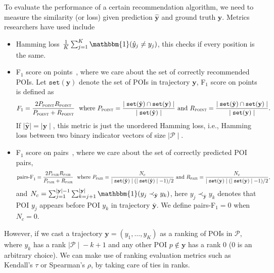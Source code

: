 To evaluate the performance of a certain recommendation algorithm,
we need to measure the similarity (or loss) given prediction $\hat{\mathbf{y}}$ and ground truth $\mathbf{y}$.
Metrics researchers have used include
\begin{itemize}
\item Hamming loss $\frac{1}{K} \sum_{j=1}^K \mathbbm{1}(\hat{y}_j \neq y_j)$, this checks if every position is the same.

\item F$_1$ score on points~\cite{ijcai15}, where we care about the set of correctly recommended POIs. 
      Let $\texttt{set}(\mathbf{y})$ denote the set of POIs in trajectory $\mathbf{y}$, F$_1$ score on points is defined as
\begin{equation*}
F_1 = \frac{2  P_{\textsc{point}}  R_{\textsc{point}}}{P_{\textsc{point}} + R_{\textsc{point}}} ~~\text{where}~
P_{\textsc{point}} = \frac{\mid \texttt{set}(\hat{\mathbf{y}}) \cap \texttt{set}(\mathbf{y}) \mid}{\mid \texttt{set}(\hat{\mathbf{y}}) \mid}~\text{and}~
R_{\textsc{point}} = \frac{\mid \texttt{set}(\hat{\mathbf{y}}) \cap \texttt{set}(\mathbf{y}) \mid}{\mid \texttt{set}(\mathbf{y}) \mid}.
\end{equation*}
If $\mid\!\! \hat{\mathbf{y}} \!\!\mid = \mid\!\! \mathbf{y} \!\!\mid$, this metric is just the unordered Hamming loss, 
i.e., Hamming loss between two binary indicator vectors of size $\mid\!\! \mathcal{P} \!\!\mid$.


\item F$_1$ score on pairs~\cite{cikm16paper}, where we care about the set of correctly predicted POI pairs,
\begin{equation*}
\text{pairs-F}_1 = \frac{2 P_{\textsc{pair}} R_{\textsc{pair}}}{P_{\textsc{pair}} + R_{\textsc{pair}}}~~\text{where}~
P_{\textsc{pair}} = \frac{N_c} {\mid \texttt{set}(\hat{\mathbf{y}}) \mid (\mid \texttt{set}(\hat{\mathbf{y}}) \mid - 1) / 2}~\text{and}~
R_{\textsc{pair}} = \frac{N_c} {\mid \texttt{set}(\mathbf{y}) \mid (\mid \texttt{set}(\mathbf{y}) \mid - 1) / 2},
\end{equation*}
and $N_c = \sum_{j=1}^{\mid \mathbf{y} \mid - 1} \sum_{k=j+1}^{\mid \mathbf{y} \mid} \mathbbm{1}(y_j \prec_{\bar{\mathbf{y}}} y_k)$,
here $y_j \prec_{\bar{\mathbf{y}}} y_k$ denotes that POI $y_j$ appears before POI $y_k$ in trajectory $\bar{\mathbf{y}}$.
We define pairs-F$_1 = 0$ when $N_c = 0$.

\end{itemize}

However, if we cast a trajectory $\mathbf{y} = (y_1,\dots,y_K)$ as a ranking of POIs in $\mathcal{P}$,
where $y_k$ has a rank $\mid\!\! \mathcal{P} \!\!\mid\! - k + 1$ and any other POI $p \notin \mathbf{y}$ has a rank $0$ ($0$ is an arbitrary choice).
We can make use of ranking evaluation metrics such as Kendall's $\tau$ or Spearman's $\rho$, by taking care of ties in ranks.

